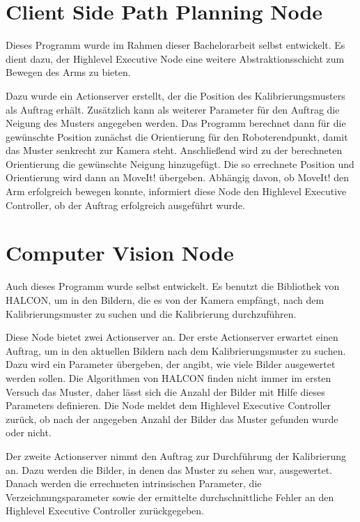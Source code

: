 \section{Client Side Path Planning Node} %
\label{sec:movearmserver}
Dieses Programm wurde im Rahmen dieser Bachelorarbeit selbst entwickelt. Es dient dazu, der Highlevel Executive Node eine weitere Abstraktionsschicht zum Bewegen des Arms zu bieten.

Dazu wurde ein Actionserver erstellt, der die Position des Kalibrierungsmusters als Auftrag erhält. Zusätzlich kann als weiterer Parameter für den Auftrag die Neigung des Musters angegeben werden. Das Programm berechnet dann für die gewünschte Position zunächst die Orientierung für den Roboterendpunkt, damit das Muster senkrecht zur Kamera steht. Anschließend wird zu der berechneten Orientierung die gewünschte Neigung hinzugefügt. Die so errechnete Position und Orientierung wird dann an MoveIt! übergeben. Abhängig davon, ob MoveIt! den Arm erfolgreich bewegen konnte, informiert diese Node den Highlevel Executive Controller, ob der Auftrag erfolgreich ausgeführt wurde.

\section{Computer Vision Node} %
\label{sec:caltab_detector_node}
Auch dieses Programm wurde selbst entwickelt. Es benutzt die Bibliothek von HALCON, um in den Bildern, die es von der Kamera empfängt, nach dem Kalibrierungsmuster zu suchen und die Kalibrierung durchzuführen.

Diese Node bietet zwei Actionserver an. Der erste Actionserver erwartet einen Auftrag, um in den aktuellen Bildern nach dem Kalibrierungsmuster zu suchen. Dazu wird ein Parameter übergeben, der angibt, wie viele Bilder ausgewertet werden sollen. Die Algorithmen von HALCON finden nicht immer im ersten Versuch das Muster, daher lässt sich die Anzahl der Bilder mit Hilfe dieses Parameters definieren. Die Node meldet dem Highlevel Executive Controller zurück, ob nach der angegeben Anzahl der Bilder das Muster gefunden wurde oder nicht.

Der zweite Actionserver nimmt den Auftrag zur Durchführung der Kalibrierung an. Dazu werden die Bilder, in denen das Muster zu sehen war, ausgewertet. Danach werden die errechneten intrinsischen Parameter, die Verzeichnungsparameter sowie der ermittelte durchschnittliche Fehler an den Highlevel Executive Controller zurückgegeben.

